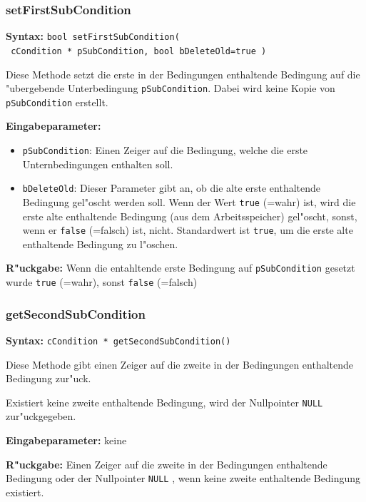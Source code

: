\subsubsection{setFirstSubCondition}

\textbf{Syntax:} \verb|bool setFirstSubCondition(| \\\verb| cCondition * pSubCondition, bool bDeleteOld=true )|

\bigskip\noindent
Diese Methode setzt die erste in der Bedingungen enthaltende Bedingung auf die "ubergebende Unterbedingung \verb|pSubCondition|. Dabei wird keine Kopie von \verb|pSubCondition| erstellt.

\bigskip\noindent
\textbf{Eingabeparameter:}
\begin{itemize}
 \item \verb|pSubCondition|: Einen Zeiger auf die Bedingung, welche die erste Unternbedingungen enthalten soll.
 \item \verb|bDeleteOld|: Dieser Parameter gibt an, ob die alte erste enthaltende Bedingung gel"oscht werden soll. Wenn der Wert \verb|true| (=wahr) ist, wird die erste alte enthaltende Bedingung (aus dem Arbeitsspeicher) gel"oscht, sonst, wenn er \verb|false| (=falsch) ist, nicht. Standardwert ist \verb|true|, um die erste alte enthaltende Bedingung zu l"oschen.
\end{itemize}

\bigskip\noindent
\textbf{R"uckgabe:} Wenn die entahltende erste Bedingung auf \verb|pSubCondition| gesetzt wurde \verb|true| (=wahr), sonst \verb|false| (=falsch)


\subsubsection{getSecondSubCondition}

\textbf{Syntax:} \verb|cCondition * getSecondSubCondition()|

\bigskip\noindent
Diese Methode gibt einen Zeiger auf die zweite in der Bedingungen enthaltende Bedingung zur"uck.

Existiert keine zweite enthaltende Bedingung, wird der Nullpointer \verb|NULL| zur"uckgegeben.

\bigskip\noindent
\textbf{Eingabeparameter:} keine

\bigskip\noindent
\textbf{R"uckgabe:} Einen Zeiger auf die zweite in der Bedingungen enthaltende Bedingung oder der Nullpointer \verb|NULL| , wenn keine zweite enthaltende Bedingung existiert.


